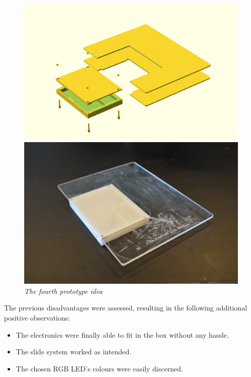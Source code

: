 \begin{figure}[h]
\begin{minipage}[b]{.5\textwidth}
\includegraphics[width=1.05\textwidth]{figures/iterations/v6.png}
\end{minipage}
\begin{minipage}[b]{.5\textwidth}
\includegraphics[width=1\textwidth]{figures/iterations/v6-photo.jpg}
\end{minipage}
\caption{\small {\it {The fourth prototype idea}}} 
\label{fig:v5}
\end{figure}

The previous disadvantages were assessed, resulting in the following additional positive observations:

\begin{itemize} \itemsep0em
  \item The electronics were finally able to fit in the box without any hassle.
  \item The slide system worked as intended.
  \item The chosen RGB LED's colours were easily discerned.
\end{itemize}

